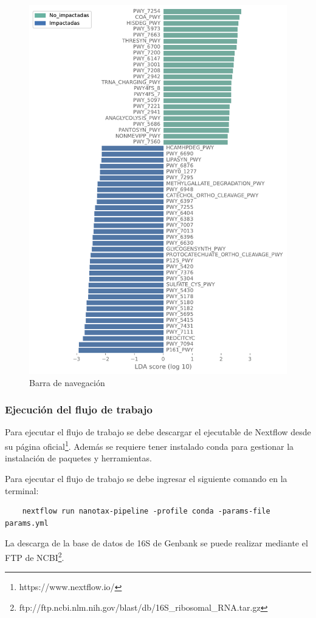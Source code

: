     \begin{figure}[H]
        \includegraphics[width=1\linewidth]{images/pipeline/lefse_plot.pdf}
        \caption{Barra de navegación}
        \label{fig:pipeline-lefse}
    \end{figure}
\subsubsection{Ejecución del flujo de trabajo}\label{pipeline:how_to_run}
Para ejecutar el flujo de trabajo se debe descargar el ejecutable de Nextflow desde su página oficial\footnote{https://www.nextflow.io/}. 
Además se requiere tener instalado conda para gestionar la instalación de paquetes y herramientas.

Para ejecutar el flujo de trabajo se debe ingresar el siguiente comando en la terminal:
\begin{verbatim}
    nextflow run nanotax-pipeline -profile conda -params-file params.yml

\end{verbatim}
La descarga de la base de datos de 16S de Genbank se puede realizar mediante el FTP de NCBI\footnote{ftp://ftp.ncbi.nlm.nih.gov/blast/db/16S\_ribosomal\_RNA.tar.gz}.

